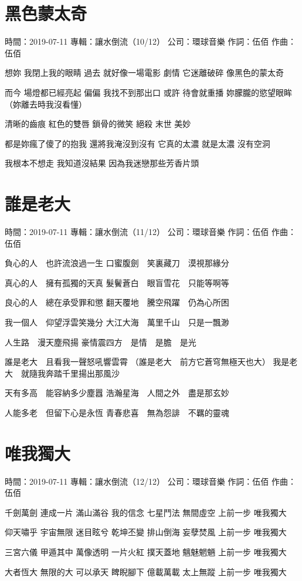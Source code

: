 \documentclass[UTF8,a4paper,oneside,twocolumn,12pt]{ctexbook}
\newcommand{\infopair}[2]{\textbullet #1：#2}
\newcommand{\zc}[1][伍佰]{\infopair{作詞}{#1}}
\newcommand{\zq}[1][伍佰]{\infopair{作曲}{#1}}
\newcommand{\zj}[1]{\infopair{專輯}{#1}}
\newcommand{\sj}[1]{\infopair{時間}{#1}}
\newcommand{\gs}[1]{\infopair{公司}{#1}}
\newenvironment{info}{\begin{flushleft}\kaishu
	}
	{\end{flushleft}\normalsize\yahei\par}
\newenvironment{lyric}{
	}
{}
\begin{document}
\section{黑色蒙太奇}
\begin{info}
	\sj{2019-07-11}
	\zj{讓水倒流（10/12）}
	\gs{環球音樂}
	\zc
	\zq
\end{info}
\begin{lyric}
	想妳 我閉上我的眼睛
	過去 就好像一場電影
	劇情 它迷離破碎
	像黑色的蒙太奇

	而今 場燈都已經亮起
	偏偏 我找不到那出口
	或許 待會就重播
	妳朦朧的慾望眼眸
	（妳離去時我沒看懂）

	清晰的齒痕 紅色的雙唇 鎖骨的微笑
	絕殺 末世 美妙

	都是妳瘋了傻了的抱我
	還將我淹沒到沒有
	它真的太濃 就是太濃
	沒有空洞

	我根本不想走
	我知道沒結果
	因為我迷戀那些芳香片頭
\end{lyric}

\section{誰是老大}
\begin{info}
	\sj{2019-07-11}
	\zj{讓水倒流（11/12）}
	\gs{環球音樂}
	\zc
	\zq
\end{info}
\begin{lyric}
	負心的人　也許流浪過一生
	口蜜腹劍　笑裏藏刀　漠視那緣分

	真心的人　擁有孤獨的天真
	髮鬢蒼白　眼盲雪花　只能等啊等

	良心的人　總在承受罪和懲
	翻天覆地　騰空飛躍　仍為心所困

	我一個人　仰望浮雲笑幾分
	大江大海　萬里千山　只是一飄渺

	人生路　漫天塵飛揚
	豪情震四方　是情　是膽　是光

	誰是老大　且看我一聲怒吼響雲霄
	（誰是老大　前方它蒼穹無極天也大）
	我是老大　就隨我奔踏千里揚出那風沙

	天有多高　能容納多少塵囂
	浩瀚星海　人間之外　盡是那玄妙

	人能多老　但留下心是永恆
	青春悲喜　無為怨誹　不羈的靈魂
\end{lyric}

\section{唯我獨大}
\begin{info}
	\sj{2019-07-11}
	\zj{讓水倒流（12/12）}
	\gs{環球音樂}
	\zc
	\zq
\end{info}
\begin{lyric}
	千劍萬劍 連成一片
	滿山滿谷 我的信念
	七星鬥法 無間虛空
	上前一步 唯我獨大

	仰天嘯乎 宇宙無限
	迷目眩兮 乾坤丕變
	排山倒海 妄孽焚風
	上前一步 唯我獨大

	三宮六儀 甲遁其中
	萬像透明 一片火紅
	撲天蓋地 魑魅魍魎
	上前一步 唯我獨大

	大者恆大 無限的大
	可以承天 睥睨腳下
	億載萬載 太上無蹤
	上前一步 唯我獨大
\end{lyric}
\end{document}
